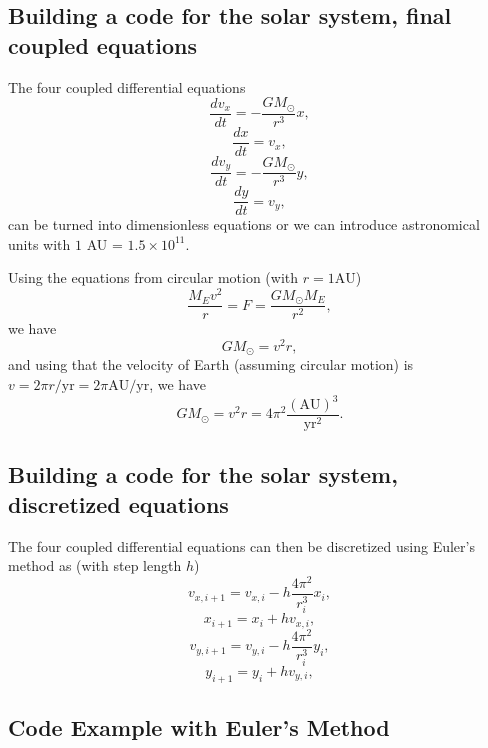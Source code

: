 \documentclass[%
oneside,                 %
final,                   %
10pt]{article}
\begin{document}
\subsection{Building a code for the solar system, final coupled equations}

The four coupled differential equations
\[
\frac{dv_x}{dt}=-\frac{GM_{\odot}}{r^3}x,
\]
\[
\frac{dx}{dt}=v_x,
\]
\[
\frac{dv_y}{dt}=-\frac{GM_{\odot}}{r^3}y,
\]
\[
\frac{dy}{dt}=v_y,
\]
can be turned into dimensionless equations or we can introduce astronomical units with $1$ AU = $1.5\times 10^{11}$. 

Using the equations from circular motion (with $r =1\mathrm{AU}$) 
\[
\frac{M_E v^2}{r} = F = \frac{GM_{\odot}M_E}{r^2},
\]
we have
\[
GM_{\odot}=v^2r,
\]
and using that the velocity of Earth (assuming circular motion) is
$v = 2\pi r/\mathrm{yr}=2\pi\mathrm{AU}/\mathrm{yr}$, we have
\[
GM_{\odot}= v^2r = 4\pi^2 \frac{(\mathrm{AU})^3}{\mathrm{yr}^2}.
\]

\subsection{Building a code for the solar system, discretized equations}

The four coupled differential equations can then be discretized using Euler's method as (with step length $h$)
\[
v_{x,i+1}=v_{x,i}-h\frac{4\pi^2}{r_i^3}x_i,
\]
\[
x_{i+1}=x_i+hv_{x,i},
\]
\[
v_{y,i+1}=v_{y,i}-h\frac{4\pi^2}{r_i^3}y_i,
\]
\[
y_{i+1}=y_i+hv_{y,i},
\]

\subsection{Code Example with Euler's Method}
\end{document}
